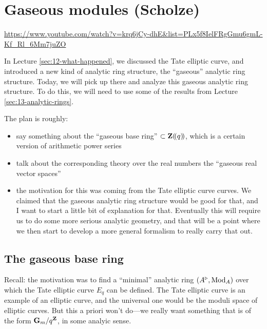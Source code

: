 
\section{\ufs Gaseous modules (Scholze)}
\label{sec:14-gaseous}

\url{https://www.youtube.com/watch?v=krq6jCy-dhE&list=PLx5f8IelFRgGmu6gmL-Kf_Rl_6Mm7juZO}
\renewcommand{\yt}[2]{\href{https://www.youtube.com/watch?v=krq6jCy-dhE&list=PLx5f8IelFRgGmu6gmL-Kf_Rl_6Mm7juZO&t=#1}{#2}}
\vspace{1em}

In Lecture \ref{sec:12-what-happened}, we discussed the Tate elliptic curve, and introduced a new kind of analytic ring structure, the ``gaseous'' analytic ring structure. Today, we will pick up there and analyze this gaseous analytic ring structure. To do this, we will need to use some of the results from Lecture \ref{sec:13-analytic-rings}.

The plan is roughly:
\begin{itemize}
  \item say something about the ``gaseous base ring'' $\subset\mathbf Z(\!(q)\!)$, which is a certain version of arithmetic power series
  \item talk about the corresponding theory over the real numbers the ``gaseous real vector spaces''
  \item the motivation for this was coming from the Tate elliptic curve curves. We claimed that the gaseous analytic ring structure would be good for that, and I want to start a little bit of explanation for that. Eventually this will require us to do some more serious analytic geometry, and that will be a point where we then start to develop a more general formalism to really carry that out.
\end{itemize}


\subsection{\ufs The gaseous base ring}
Recall: the motivation was to find a ``minimal'' analytic ring $(A^\triangleright,\operatorname{Mod}_A)$ over which the Tate elliptic curve $E_q$ can be defined. The Tate elliptic curve is an example of an elliptic curve, and the universal one would be the moduli space of elliptic curves. But this a priori won't do---we really want something that is of the form $\mathbf G_m/q^\mathbf Z$, in some analyic sense.

